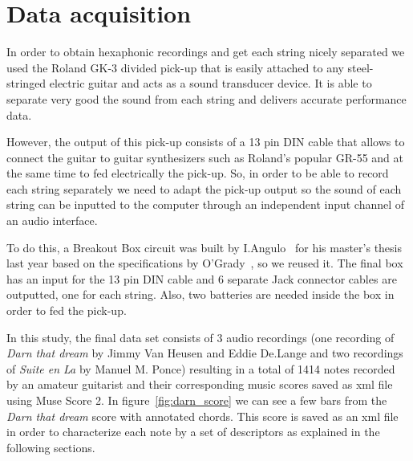 \section{Data acquisition}
In order to obtain hexaphonic recordings and get each string nicely separated we used the Roland GK-3 divided pick-up that is easily attached to any steel-stringed electric guitar and acts as a sound transducer device. It is able to separate very good the sound from each string and delivers accurate performance data.

However, the output of this pick-up consists of a 13 pin DIN cable that allows to connect the guitar to guitar synthesizers such as Roland's popular GR-55 and at the same time to fed electrically the pick-up. So, in order to be able to record each string separately we need to adapt the pick-up output so the sound of each string can be inputted to the computer through an independent input channel of an audio interface.

To do this, a Breakout Box circuit was built by I.Angulo~\cite{Angulo2016} for his master's thesis last year based on the specifications by O'Grady~\cite{OGrady2009}, so we reused it. The final box has an input for the 13 pin DIN cable and 6 separate Jack connector cables are outputted, one for each string. Also, two batteries are needed inside the box in order to fed the pick-up. 

In this study, the final data set consists of 3 audio recordings (one recording of \textit{Darn that dream} by Jimmy Van Heusen and Eddie De.Lange and two recordings of \textit{Suite en La} by Manuel M. Ponce) resulting in a total of 1414 notes recorded by an amateur guitarist and their corresponding music scores saved as xml file using Muse Score 2. In figure~\ref{fig:darn_score} we can see a few bars from the \textit{Darn that dream} score with annotated chords. This score is saved as an xml file in order to characterize each note by a set of descriptors as explained in the following sections.  

